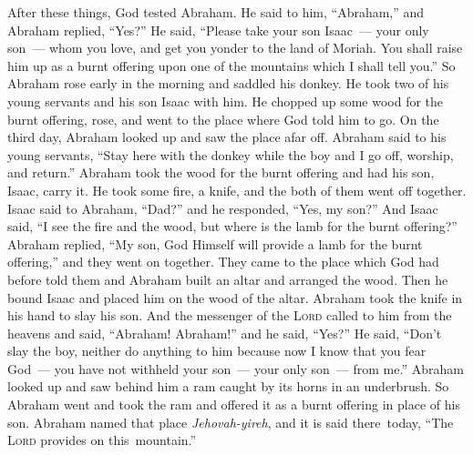 
\begin{inparaenum}
     After these things, God tested Abraham. He said to him, ``Abraham,'' and Abraham replied, ``Yes?''%
     He said, ``Please take your son Isaac~--- your only son~--- whom you love, and get you yonder to the land of Moriah. You shall raise him up as a burnt offering upon one of the mountains which I shall tell you.''%
     So Abraham rose early in the morning and saddled his donkey. He took two of his young servants and his son Isaac with him. He chopped up some wood for the burnt offering, rose, and went to the place where God told him to go.%
     On the third day, Abraham looked up and saw the place afar off.%
     Abraham said to his young servants, ``Stay here with the donkey while the boy and I go off, worship, and return.''%
     Abraham took the wood for the burnt offering and had his son, Isaac, carry it. He took some fire, a knife, and the both of them went off together.%
     Isaac said to Abraham, ``Dad?'' and he responded, ``Yes, my son?'' And Isaac said, ``I see the fire and the wood, but where is the lamb for the burnt offering?''%
     Abraham replied, ``My son, God Himself will provide a lamb for the burnt offering,'' and they went on together.%
     They came to the place which God had before told them and Abraham built an altar and arranged the wood. Then he bound Isaac and placed him on the wood of the altar.%
     Abraham took the knife in his hand to slay his son.%
     And the messenger of the \textsc{Lord} called to him from the heavens and said, ``Abraham! Abraham!'' and he said, ``Yes?''%
     He said, ``Don't slay the boy, neither do anything to him because now I know that you fear God~--- you have not withheld your son~--- your only son~--- from me.''%
     Abraham looked up and saw behind him a ram caught by its horns in an underbrush. So Abraham went and took the ram and offered it as a burnt offering in place of his son.%
     Abraham named that place \textit{Jehovah-yireh}, and it is said there\understood\ today, ``The \textsc{Lord} provides on this\understood\ mountain.''%

\end{inparaenum}
